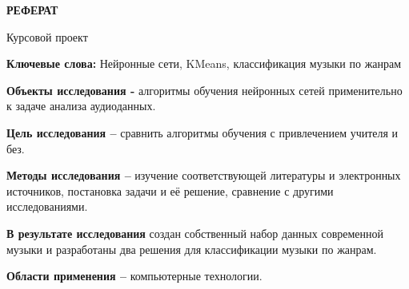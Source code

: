 \begin{center}
  \large\bfseries{РЕФЕРАТ}
\end{center}

Курсовой проект%

\textbf{Ключевые слова:} Нейронные сети, KMeans, классификация музыки по жанрам

\textbf{Объекты исследования -} алгоритмы обучения нейронных сетей применительно к задаче анализа аудиоданных.

\textbf{Цель исследования --} сравнить алгоритмы обучения с привлечением учителя и без.

\textbf{Методы исследования --} изучение соответствующей литературы и электронных источников, постановка задачи и её решение, сравнение с другими исследованиями.

\textbf{В результате исследования} создан собственный набор данных современной музыки и разработаны два решения для классификации музыки по жанрам.

\textbf{Области применения --} компьютерные технологии.

\newpage